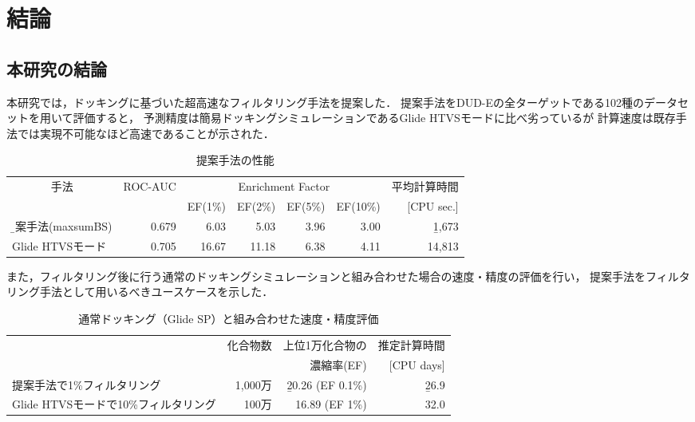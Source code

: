 \chapter{結論}
\section{本研究の結論}\label{sec:conclusion}
本研究では，ドッキングに基づいた超高速なフィルタリング手法を提案した．
提案手法をDUD-Eの全ターゲットである102種のデータセットを用いて評価すると，
予測精度は簡易ドッキングシミュレーションであるGlide HTVSモードに比べ劣っているが
計算速度は既存手法では実現不可能なほど高速であることが示された．
\begin{table}[h] \centering
	\caption{提案手法の性能}
	\label{table:conclusion_1}
	\begin{tabular}{l|rrrrrr}
	\hline
	\multicolumn{1}{c|}{\multirow{2}{*}{手法}}	&\multirow{2}{*}{ROC-AUC}	&\multicolumn{4}{c}{Enrichment Factor}	&平均計算時間	\\
										&						&EF(1\%)	&EF(2\%)	&EF(5\%)	&EF(10\%)	&[CPU sec.]		\\ \hline
	\b{提案手法(maxsumBS)}				&0.679					&6.03	&5.03	&3.96	&3.00		&\b{1,673}		\\
	Glide HTVSモード				&0.705				&16.67	&11.18	&6.38	&4.11		&14,813			\\ \hline
	\end{tabular}
\end{table}



また，フィルタリング後に行う通常のドッキングシミュレーションと組み合わせた場合の速度・精度の評価を行い，
提案手法をフィルタリング手法として用いるべきユースケースを示した．
\begin{table}[htbp] \centering
	\caption{通常ドッキング（Glide SP）と組み合わせた速度・精度評価}
	\label{table:conclusion_2}
	\begin{tabular}{l|rrr}
	\hline
												&\multirow{2}{*}{化合物数}	&上位1万化合物の		&推定計算時間	\\
												&														&濃縮率(EF)				&[CPU days]		\\ \hline
	提案手法で1\%フィルタリング		&1,000万											&\b{20.26 (EF 0.1\%)}		&\b{26.9}				\\
	Glide HTVSモードで10\%フィルタリング	&100万												&16.89 (EF 1\%)			&32.0				\\ \hline
	\end{tabular}
\end{table}


